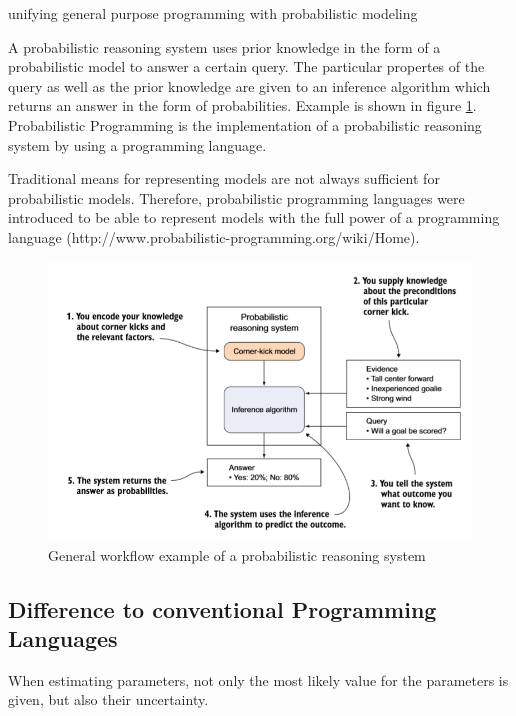 \documentclass{article}
\begin{document}
unifying general purpose programming with probabilistic modeling \cite{probabilistic-programming.org}


A \gls{probabilistic reasoning system} uses prior knowledge in the form of a \gls{probabilistic model} to answer a certain query. The particular propertes of the query as well as the prior knowledge are given to an \gls{inference algorithm} which returns an answer in the form of probabilities. Example is shown in figure \ref{fig:example_prs}. Probabilistic Programming is the implementation of a \gls{probabilistic reasoning system} by using a programming language.

Traditional means for representing models are not always sufficient for probabilistic models. Therefore, probabilistic programming languages were introduced to be able to represent models with the full power of a programming language (http://www.probabilistic-programming.org/wiki/Home).


\begin{figure}
	\includegraphics[width=\textwidth]{images/probabilistic_reasoning_system.PNG}
	\caption[General workflow example of a probabilistic reasoning system. Source: \cite{9781617292330}]{General workflow example of a probabilistic reasoning system}
	\label{fig:example_prs}
\end{figure}

\subsection{Difference to conventional Programming Languages}

When estimating parameters, not only the most likely value for the parameters is given, but also their uncertainty.
\end{document}
